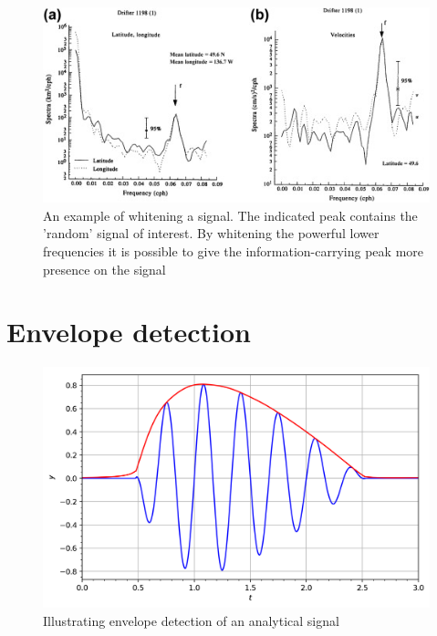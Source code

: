 \begin{figure}[h!t]
	\begin{center}
		\includegraphics[width=0.7\columnwidth]{images/prewhitening_example.jpg}
	\end{center}
	\caption{An example of whitening a signal. The indicated peak contains the 'random' signal of interest. By whitening the powerful lower frequencies it is possible to give the information-carrying peak more presence on the signal \cite{time_series_analysis_methods}}
	\label{fig:whitening_example}
\end{figure}


\section{Envelope detection}

\begin{figure}[h!t]
	\begin{center}
		\includegraphics[width=0.7\columnwidth]{images/envelope_wikipedia.png}
	\end{center}
	\caption{Illustrating envelope detection of an analytical signal \cite{envelope_wikipedia}}
	\label{fig:envelope_wikipedia}
\end{figure}

